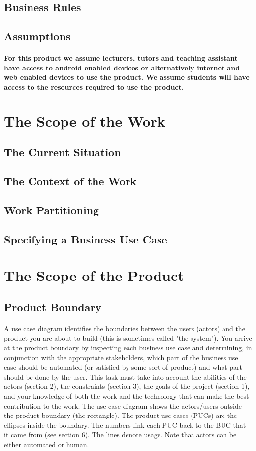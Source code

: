 \documentclass[12pt,a4paper]{article}
\begin{document}
\subsection{Business Rules}
\subsection{Assumptions}
\paragraph{For this product we assume lecturers, tutors and teaching assistant have access to android enabled devices or alternatively internet and web enabled devices to use the product.
We assume students will have access to the resources required to use the product.
}
\pagebreak
\section{The Scope of the Work}
\subsection{The Current Situation}
\subsection{The Context of the Work}
\subsection{Work Partitioning}
\subsection{Specifying a Business Use Case}
\pagebreak
\section{The Scope of the Product}
\subsection{Product Boundary}
\paragraph{}
A use case diagram identifies the boundaries between the users (actors) and the product you are about to build (this is sometimes called "the system"). You arrive at the product boundary by inspecting each business use case and determining, in conjunction with the appropriate stakeholders, which part of the business use case should be automated (or satisfied by some sort of product) and what part should be done by the user. This task must take into account the abilities of the actors (section 2), the constraints (section 3), the goals of the project (section 1), and your knowledge of both the work and the technology that can make the best contribution to the work.
The use case diagram shows the actors/users outside the product boundary (the rectangle). The product use cases (PUCs) are the ellipses inside the boundary. The numbers link each PUC back to the BUC that it came from (see section 6). The lines denote usage. Note that actors can be either automated or human.
\end{document}
